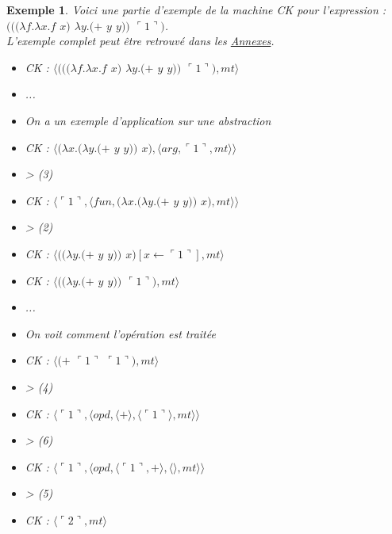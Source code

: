 \documentclass[10pt,a4paper]{report}
\newtheorem{ex}{Exemple}
\begin{document}
	\begin{ex}
		Voici une partie d'exemple de la machine CK pour l'expression : 
		$(((\lambda f.\lambda x.f$ $x)$ $\lambda y.(+$ $y$ $y))$ $\ulcorner 1\urcorner)$.
		\\ L'exemple complet peut être retrouvé dans les \hyperref[CK]{Annexes}.
		
		\begin{multicols}{2}\raggedright{
				\begin{itemize}
					\item[] CK : $\langle(((\lambda f.\lambda x.f$ $x)$ $\lambda y.(+$ $y$ $y))$ $\ulcorner 1\urcorner),mt\rangle$
					\item[] ...
					\item[] On a un exemple d'application sur une abstraction
					\item[] CK : $\langle(\lambda x.(\lambda y.(+$ $y$ $y))$ $x),\langle arg,\ulcorner 1\urcorner,mt\rangle\rangle$	
					\item[] > (3) 
					\item[] CK : $\langle\ulcorner 1\urcorner,\langle fun,(\lambda x.(\lambda y.(+$ $y$ $y))$ $x),mt\rangle\rangle$
					\item[] > (2) 
					\item[] CK : $\langle((\lambda y.(+$ $y$ $y))$ $x)[x \leftarrow \ulcorner 1\urcorner ],mt\rangle$
					\item[] CK : $\langle((\lambda y.(+$ $y$ $y))$ $\ulcorner 1\urcorner),mt\rangle$
				\end{itemize}
				
				\begin{itemize}
					\item[] ...
					\item[] On voit comment l'opération est traitée
					\item[] CK : $\langle(+$ $\ulcorner 1\urcorner$ $\ulcorner 1\urcorner),mt\rangle$
					\item[] > (4)
					\item[] CK : $\langle\ulcorner 1\urcorner,\langle opd,\langle + \rangle,\langle\ulcorner 1\urcorner\rangle,mt\rangle\rangle$
					\item[] > (6) 
					\item[] CK : $\langle\ulcorner 1\urcorner,\langle opd,\langle\ulcorner 1\urcorner,+ \rangle,\langle\rangle,mt\rangle\rangle$
					\item[] > (5) 
					\item[] CK : $\langle\ulcorner 2\urcorner,mt\rangle$
				\end{itemize}
			}
		\end{multicols}
	\end{ex}
	\newpage
	
\end{document}
